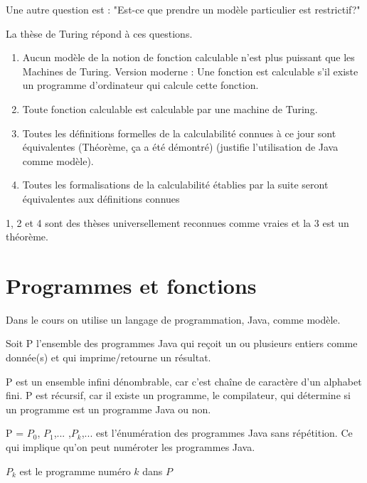 Une autre question est : "Est-ce que prendre un modèle particulier est restrictif?"

La thèse de Turing répond à ces questions.
\begin{enumerate}
	\item Aucun modèle de la notion de fonction calculable n'est plus puissant que les Machines de Turing.
		Version moderne : Une fonction est calculable s'il existe un programme d'ordinateur qui calcule cette fonction.
	\item Toute fonction calculable est calculable par une machine de Turing.
	\item Toutes les définitions formelles de la calculabilité connues à ce jour sont équivalentes (Théorème, ça a été démontré) (justifie l'utilisation de Java comme modèle).
	\item Toutes les formalisations de la calculabilité établies par la
		suite seront équivalentes aux définitions connues
\end{enumerate}
1, 2 et 4 sont des thèses universellement reconnues comme vraies et la 3 est un théorème.


\section{Programmes et fonctions}
\label{sub:programmes_et_fonctions}
Dans le cours on utilise un langage de programmation, Java, comme modèle.

\begin{mydef}[P]
	Soit P l'ensemble des programmes Java qui reçoit un ou plusieurs entiers comme donnée(s) et qui imprime/retourne un résultat.
\end{mydef}

\begin{myprop}
	P est un ensemble infini dénombrable, car c'est chaîne de caractère d'un alphabet fini. P est récursif, car il existe un programme, le compilateur, qui détermine si un programme est un programme Java ou non.
\end{myprop}

\begin{mydef}[Énumération de P]
	P = $P_0$, $P_1$,... ,$P_k$,... est l'énumération des programmes Java sans répétition. Ce qui implique qu'on peut numéroter les programmes Java.\\
\end{mydef}

\begin{mydef}[$P_k$]
	$P_k$ est le programme numéro $k$ dans $P$
\end{mydef}


